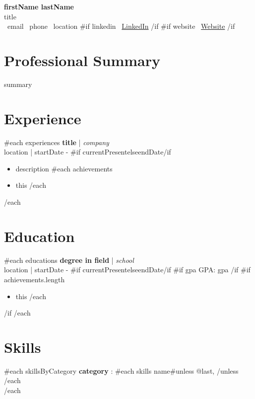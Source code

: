 \documentclass[11pt,a4paper]{article}
\begin{document}
\begin{center}
    {\Huge\bfseries\color{text} {{firstName}} {{lastName}}}\\[0.5em]
    {\large\color{primary} {{title}}}\\[0.5em]
    \faEnvelope\ {{email}} \quad
    \faPhone\ {{phone}} \quad
    \faMapMarker\ {{location}}
    {{#if linkedin}}
        \quad \faLinkedin\ \href{ {{linkedin}} }{LinkedIn}
    {{/if}}
    {{#if website}}
        \quad \faGlobe\ \href{ {{website}} }{Website}
    {{/if}}
\end{center}

\section*{Professional Summary}
{{summary}}

\section*{Experience}
{{#each experiences}}
    \textbf{ {{title}} } | \textit{ {{company}} }\\
    {{location}} | {{startDate}} - {{#if current}}Present{{else}}{{endDate}}{{/if}}
    \begin{itemize}
        \item {{description}}
        {{#each achievements}}
            \item {{this}}
        {{/each}}
    \end{itemize}
{{/each}}

\section*{Education}
{{#each educations}}
    \textbf{ {{degree}} in {{field}} } | \textit{ {{school}} }\\
    {{location}} | {{startDate}} - {{#if current}}Present{{else}}{{endDate}}{{/if}}
    {{#if gpa}}
        \quad GPA: {{gpa}}
    {{/if}}
    {{#if achievements.length}}
        \begin{itemize}
            {{#each achievements}}
                \item {{this}}
            {{/each}}
        \end{itemize}
    {{/if}}
{{/each}}

\section*{Skills}
{{#each skillsByCategory}}
    \textbf{ {{category}} }:
    {{#each skills}}
        {{name}}{{#unless @last}}, {{/unless}}
    {{/each}}\\
{{/each}}
\end{document}
